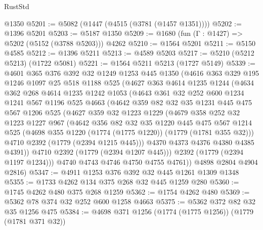 \begin{lexlean}{RustStd}
\begin{coremodule}
    @1350
@5201 := @5082 (@1447 (@4515 (@3781 (@1457 @1351))))
@5202 := @1396 @5201
@5203 := @5187 @1350
@5209 := @1680 (fun (Γ : @1427) => @5202 (@5152 (@3788 @5203))) @4262
@5210 := @1564 @5201
@5211 := @5150 @4585
@5212 := @1396 @5211
@5213 := @4589 @5203
@5217 := @5210 (@5212 @5213) (@1722 @5081)
@5221 := @1564 @5211 @5213 (@1727 @5149)
@5339 := @4601
    @365
    @376
    @392
    @32
    @1249
    @1253
    @445
    @1350
    (@4616
      @363
      @329
      @195
      @1246
      @1097
      @25
      @518
      @1188
      @525
      (@4627
        @363
        @4614
        @1235
        @1244
        (@4634
          @362
          @268
          @4614
          @1235
          @1242
          @1053
          (@4643
            @361
            @32
            @252
            @600
            @1234
            @1241
            @567
            @1196
            @525
            @4663
            (@4642
              @359
              @82
              @32
              @35
              @1231
              @445
              @475
              @567
              @1206
              @525
              (@4627
                @359
                @32
                @1223
                @1229
                (@4679
                  @358
                  @252
                  @32
                  @1223
                  @1227
                  @967
                  (@4642
                    @356
                    @82
                    @32
                    @35
                    @1220
                    @445
                    @475
                    @567
                    @1214
                    @525
                    (@4698 @355 @1220 (@1774 (@1775 @1220)) (@1779 (@1781 @355 @32)))
                    @4710
                    @2392
                    (@1779 (@2394 @1215 @445)))
                  @4370
                  @4373
                  @4376
                  @4380
                  @4385
                  @4391))
              @4710
              @2392
              (@1779 (@2394 @1207 @445)))
            @2392
            (@1779 (@2394 @1197 @1234)))
          @4740
          @4743
          @4746
          @4750
          @4755
          @4761))
      @4898
      @2804
      @4904
      @2816)
@5347 := @4911 @1253 @376 @392 @32 @445 @1261 @1309 @1348
@5355 := @1733 @4262 @134 @375 @268 @32 @445 @1259 @280
@5360 := @1745 @4262 @480 @375 @268 @1259
@5362 := @1754 @4262 @480
@5369 := @5362 @78 @374 @32 @252 @600 @1258 @4663
@5375 := @5362 @372 @82 @32 @35 @1256 @475
@5384 := @4698 @371 @1256 (@1774 (@1775 @1256)) (@1779 (@1781 @371 @32))

\end{coremodule}
\end{lexlean}

